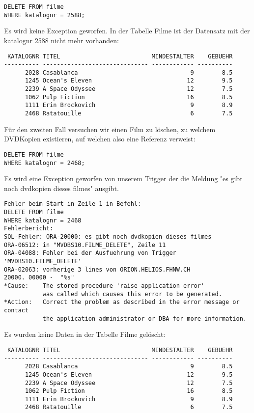 \documentclass[11pt,a4paper,parskip=half]{scrartcl}
\begin{document}
\begin{lstlisting}
DELETE FROM filme
WHERE katalognr = 2588;
\end{lstlisting}

Es wird keine Exception geworfen. In der Tabelle Filme ist der Datensatz mit der katalognr 2588 nicht mehr vorhanden:

\begin{lstlisting}
 KATALOGNR TITEL                          MINDESTALTER    GEBUEHR
---------- ------------------------------ ------------ ----------
      2028 Casablanca                                9        8.5 
      1245 Ocean's Eleven                           12        9.5 
      2239 A Space Odyssee                          12        7.5 
      1062 Pulp Fiction                             16        8.5 
      1111 Erin Brockovich                           9        8.9 
      2468 Ratatouille                               6        7.5 
\end{lstlisting}

Für den zweiten Fall versuchen wir einen Film zu löschen, zu welchem DVDKopien existieren, auf welchen also eine Referenz verweist:

\begin{lstlisting}
DELETE FROM filme
WHERE katalognr = 2468;
\end{lstlisting}

Es wird eine Exception geworfen von unserem Trigger der die Meldung "es gibt noch dvdkopien dieses filmes" ausgibt.

\begin{lstlisting}
Fehler beim Start in Zeile 1 in Befehl:
DELETE FROM filme
WHERE katalognr = 2468
Fehlerbericht:
SQL-Fehler: ORA-20000: es gibt noch dvdkopien dieses filmes
ORA-06512: in "MVDBS10.FILME_DELETE", Zeile 11
ORA-04088: Fehler bei der Ausfuehrung von Trigger 'MVDBS10.FILME_DELETE'
ORA-02063: vorherige 3 lines von ORION.HELIOS.FHNW.CH
20000. 00000 -  "%s"
*Cause:    The stored procedure 'raise_application_error'
           was called which causes this error to be generated.
*Action:   Correct the problem as described in the error message or contact
           the application administrator or DBA for more information.
\end{lstlisting}

Es wurden keine Daten in der Tabelle Filme gelöscht:

\begin{lstlisting}
 KATALOGNR TITEL                          MINDESTALTER    GEBUEHR
---------- ------------------------------ ------------ ----------
      2028 Casablanca                                9        8.5 
      1245 Ocean's Eleven                           12        9.5 
      2239 A Space Odyssee                          12        7.5 
      1062 Pulp Fiction                             16        8.5 
      1111 Erin Brockovich                           9        8.9 
      2468 Ratatouille                               6        7.5 
\end{lstlisting}
\end{document}
